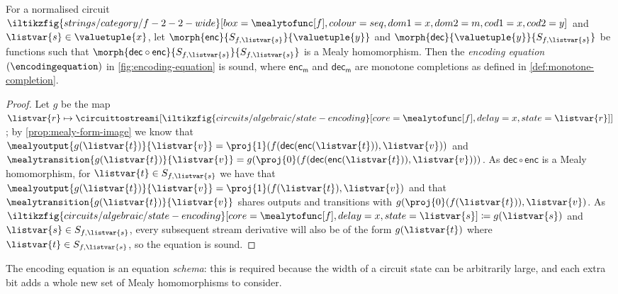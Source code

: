 \begin{proposition}\label{prop:encoding-equation}
    For a normalised circuit \(
    \iltikzfig{strings/category/f-2-2-wide}[box=\mealytofunc[f],colour=seq,dom1=x,dom2=m,cod1=x,cod2=y]
    \) and \(\listvar{s} \in \valuetuple{x}\), let
    \(\morph{\mathsf{enc}}{S_{f,\listvar{s}}}{\valuetuple{y}}\) and
    \(\morph{\mathsf{dec}}{\valuetuple{y}}{S_{f, \listvar{s}}}\) be functions
    such that \(
    \morph{\mathsf{dec} \circ \mathsf{enc}}{S_{f, \listvar{s}}}{S_{f, \listvar{s}}}
    \) is a Mealy homomorphism.
    Then the \emph{encoding equation} \((\encodingequation)\) in
    \cref{fig:encoding-equation} is sound, where
    \(\mathsf{enc}_\mathsf{m}\) and \(\mathsf{dec}_\mathsf{m}\) are monotone
    completions as defined in \cref{def:monotone-completion}.
\end{proposition}
\begin{proof}
    Let \(g\) be the map \(\listvar{r} \mapsto
    \circuittostreami[\iltikzfig{circuits/algebraic/state-encoding}[core=\mealytofunc[f],delay=x,state=\listvar{r}]]
    \); by \cref{prop:mealy-form-image} we know that \(
    \mealyoutput{g(\listvar{t})}{\listvar{v}}
    =
    \proj{1}(f(\mathsf{dec}(\mathsf{enc}(\listvar{t})), \listvar{v}))
    \) and \(
    \mealytransition{g(\listvar{t})}{\listvar{v}}
    =
    g(\proj{0}(f(\mathsf{dec}(\mathsf{enc}(\listvar{t})), \listvar{v})))
    \).
    As \(\mathsf{dec} \circ \mathsf{enc}\) is a Mealy homomorphism, for
    \(\listvar{t} \in S_{f, \listvar{s}}\) we have that \(
    \mealyoutput{g(\listvar{t})}{\listvar{v}}
    =
    \proj{1}(f(\listvar{t}), \listvar{v})
    \) and that \(
    \mealytransition{g(\listvar{t})}{\listvar{v}}
    \) shares outputs and transitions with \(
    g(\proj{0}(f(\listvar{t})), \listvar{v})
    \).
    As \(
    \iltikzfig{circuits/algebraic/state-encoding}[core=\mealytofunc[f],delay=x,state=\listvar{s}]
    \coloneqq
    g(\listvar{s})
    \) and \(\listvar{s} \in S_{f,\listvar{s}}\),
    every subsequent stream derivative will also be of the form
    \(g(\listvar{t})\) where \(\listvar{t} \in S_{f,\listvar{s}}\), so the
    equation is sound.
\end{proof}

\begin{remark}
    The encoding equation is an equation \emph{schema}: this is required because
    the width of a circuit state can be arbitrarily large, and each extra bit
    adds a whole new set of Mealy homomorphisms to consider.
\end{remark}


